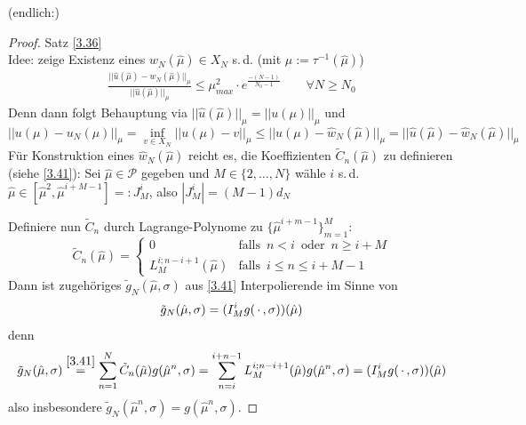 (endlich:)
\begin{proof} Satz \ref{3.36}
\\ Idee: zeige Existenz eines $\hat{w}_N(\hat{\mu}) \in X_N$ s.\,d. (mit $\mu := \tau^{-1}(\hat{\mu})$)
\begin{align}
\label{eq:3.19}
	\frac{|| \hat{u}(\hat{\mu}) - \hat{w}_N (\hat{\mu}) ||_{\mu}}{|| \hat{u}(\hat{\mu}) ||_{\mu}} \leq \mu_{max}^2 \cdot e^{\frac{-(N-1)}{N_0 - 1}} \qquad \forall N \geq N_0
\end{align}
Denn dann folgt Behauptung via $||\hat{u}(\hat{\mu})||_{\mu} = || u(\mu) ||_{\mu}$ und
\[
	|| u(\mu) - u_N(\mu) ||_{\mu} = \inf_{v \in X_N} || u(\mu) - v ||_{\mu} \leq || u(\mu) - \hat{w}_N(\hat{\mu}) ||_{\mu} = || \hat{u}(\hat{\mu}) - \hat{w}_N(\hat{\mu}) ||_{\mu}
\]
Für Konstruktion eines $\hat{w}_N(\hat{\mu})$ reicht es, die Koeffizienten $\tilde{C}_n(\hat{\mu})$ zu definieren (siehe \ref{3.41}): Sei $\hat{\mu} \in \mathcal{P}$ gegeben und $M \in \{2,\dots,N\}$ wähle $i$ s.\,d. $\hat{\mu} \in [\hat{\mu}^2,\hat{\mu}^{i+M-1}] =: J_M^i$, also $|J_M^i| = (M-1) d_N$

Definiere nun $\tilde{C}_n$ durch Lagrange-Polynome zu $\{\hat{\mu}^{i+m-1}\}_{m=1}^M$:
\[
\tilde{C}_n(\hat{\mu}) = \begin{cases}
				0 & \text{falls} \,\,\, n< i \,\,\, \text{oder} \,\,\, n \geq i+M\\
				L_M^{i;n-i+1} (\hat{\mu}) & \text{falls} \,\,\, i \leq n \leq i+M-1
			\end{cases}
\]
Dann ist zugehöriges $\tilde{g}_N(\hat{\mu}, \sigma)$ aus \ref{3.41} Interpolierende im Sinne von
\[
	\tilde{g}_N(\hat{\mu}, \sigma) = (I_M^i g(\,\cdot\,,\sigma))(\hat{\mu})
\]
denn
\[
	\tilde{g}_N(\hat{\mu}, \sigma) \overset{\ref{3.41}}{=} \sum\limits_{n=1}^N \tilde{C}_n (\hat{\mu}) g(\hat{\mu}^n,\sigma) = \sum\limits_{n=i}^{i+n-1} L_M^{i;n-i+1} (\hat{\mu}) g(\hat{\mu}^n,\sigma) = (I_M^i g(\,\cdot\,,\sigma))(\hat{\mu})
\]
also insbesondere $\tilde{g}_N(\hat{\mu}^n, \sigma) = g(\hat{\mu}^n, \sigma)$.


\end{proof}
